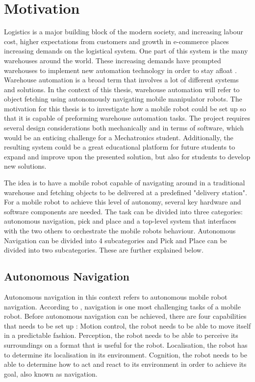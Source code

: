 \section{Motivation}
Logistics is a major building block of the modern society, and increasing labour cost, higher expectations from customers and growth in e-commerce places increasing demands on the logistical system. One part of this system is the many warehouses around the world. These increasing demands have prompted warehouses to implement new automation technology in order to stay afloat \cite{CaiKai2020Wabl}. Warehouse automation is a broad term that involves a lot of different systems and solutions. In the context of this thesis, warehouse automation will refer to object fetching using autonomously navigating mobile manipulator robots. The motivation for this thesis is to investigate how a mobile robot could be set up so that it is capable of preforming warehouse automation tasks. The project requires several design considerations both mechanically and in terms of software, which would be an enticing challenge for a Mechatronics student. Additionally, the resulting system could be a great educational platform for future students to expand and improve upon the presented solution, but also for students to develop new solutions.

The idea is to have a mobile robot capable of navigating around in a traditional warehouse and fetching objects to be delivered at a predefined "delivery station". For a mobile robot to achieve this level of autonomy, several key hardware and software components are needed. The task can be divided into three categories: autonomous navigation, pick and place and a top-level system that interfaces with the two others to orchestrate the mobile robots behaviour. Autonomous Navigation can be divided into 4 subcategories and Pick and Place can be divided into two subcategories. These are further explained below.

\subsection{Autonomous Navigation}\label{sec:I:AutonomousNavigation}
Autonomous navigation in this context refers to autonomous mobile robot navigation. According to \cite{SiegwartRoland2011Itam}, navigation is one most challenging tasks of a mobile robot. Before autonomous navigation can be achieved, there are four capabilities that needs to be set up \cite{SiegwartRoland2011Itam}: Motion control, the robot needs to be able to move itself in a predictable fashion. Perception, the robot needs to be able to perceive its surroundings on a format that is useful for the robot. Localisation, the robot has to determine its localisation in its environment. Cognition, the robot needs to be able to determine how to act and react to its environment in order to achieve its goal, also known as navigation.

